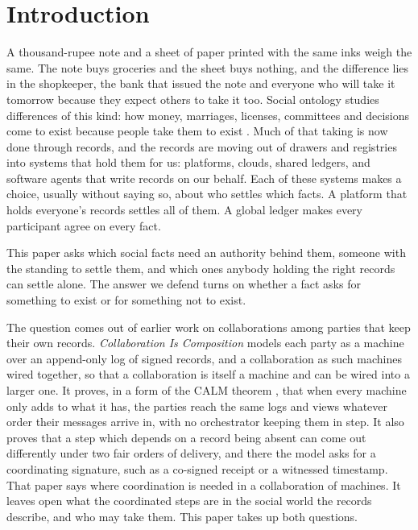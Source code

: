\section{Introduction}\label{sec:intro}

A thousand-rupee note and a sheet of paper printed with the same inks weigh the same. The note buys
groceries and the sheet buys nothing, and the difference lies in the shopkeeper, the bank that issued
the note and everyone who will take it tomorrow because they expect others to take it too. Social
ontology studies differences of this kind: how money, marriages, licenses, committees and decisions
come to exist because people take them to exist \citep{searle1995}. Much of that taking is now done
through records, and the records are moving out of drawers and registries into systems that hold
them for us: platforms, clouds, shared ledgers, and software agents that write records on our
behalf. Each of these systems makes a choice, usually without saying so, about who settles which
facts. A platform that holds everyone's records settles all of them. A global ledger makes every
participant agree on every fact.

This paper asks which social facts need an authority behind them, someone with the standing to
settle them, and which ones anybody holding the right records can settle alone. The answer we defend
turns on whether a fact asks for something to exist or for something not to exist.

The question comes out of earlier work on collaborations among parties that keep their own records.
\emph{Collaboration Is Composition} \citep{karna2026} models each party as a machine over an
append-only log of signed records, and a collaboration as such machines wired together, so that a
collaboration is itself a machine and can be wired into a larger one. It proves, in a form of the
CALM theorem \citep{hellerstein2020,ameloot2013}, that when every machine only adds to what it has,
the parties reach the same logs and views whatever order their messages arrive in, with no
orchestrator keeping them in step. It also proves that a step which depends on a record being absent
can come out differently under two fair orders of delivery, and there the model asks for a
coordinating signature, such as a co-signed receipt or a witnessed timestamp. That paper says where
coordination is needed in a collaboration of machines. It leaves open what the coordinated steps are
in the social world the records describe, and who may take them. This paper takes up both questions.

